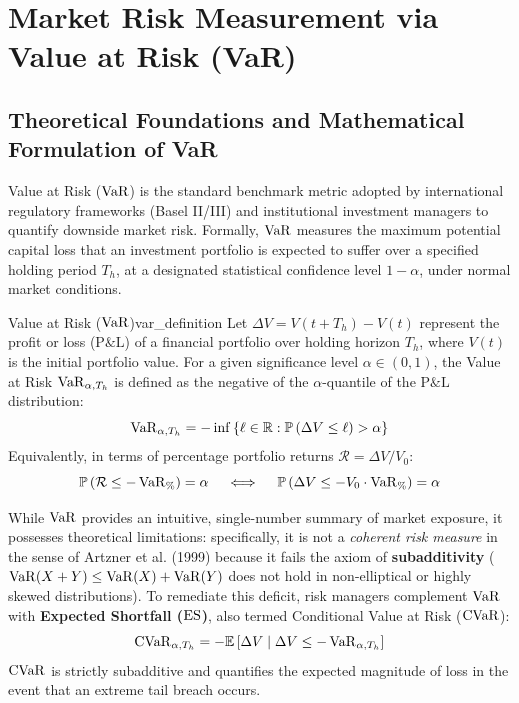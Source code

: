 
\chapter{Market Risk Measurement via Value at Risk (VaR)}
\label{ch:var_modeling}

\section{Theoretical Foundations and Mathematical Formulation of VaR}
\label{sec:var_foundations}

Value at Risk ($\operatorname{VaR}$) is the standard benchmark metric adopted by international regulatory frameworks (Basel II/III) and institutional investment managers to quantify downside market risk. Formally, $\operatorname{VaR}$ measures the maximum potential capital loss that an investment portfolio is expected to suffer over a specified holding period $T_h$, at a designated statistical confidence level $1 - \alpha$, under normal market conditions.

\begin{definition}{Value at Risk ($\operatorname{VaR}$)}{var_definition}
Let $\Delta V = V(t + T_h) - V(t)$ represent the profit or loss ($\text{P\&L}$) of a financial portfolio over holding horizon $T_h$, where $V(t)$ is the initial portfolio value. For a given significance level $\alpha \in (0, 1)$, the Value at Risk $\operatorname{VaR}_{\alpha, T_h}$ is defined as the negative of the $\alpha$-quantile of the $\text{P\&L}$ distribution:
\begin{equation}
\operatorname{VaR}_{\alpha, T_h} = -\inf \left\{ \ell \in \mathbb{R} : \mathbb{P}\left(\Delta V \le \ell\right) > \alpha \right\}
\label{eq:var_general}
\end{equation}
Equivalently, in terms of percentage portfolio returns $\mathcal{R} = \Delta V / V_0$:
\begin{equation}
\mathbb{P}\left(\mathcal{R} \le -\operatorname{VaR}_{\%}\right) = \alpha \quad \iff \quad \mathbb{P}\left(\Delta V \le -V_0 \cdot \operatorname{VaR}_{\%}\right) = \alpha
\end{equation}
\end{definition}

While $\operatorname{VaR}$ provides an intuitive, single-number summary of market exposure, it possesses theoretical limitations: specifically, it is not a \textit{coherent risk measure} in the sense of Artzner et al. (1999) because it fails the axiom of \textbf{subadditivity} ($\operatorname{VaR}(X + Y) \le \operatorname{VaR}(X) + \operatorname{VaR}(Y)$ does not hold in non-elliptical or highly skewed distributions). To remediate this deficit, risk managers complement $\operatorname{VaR}$ with \textbf{Expected Shortfall ($\operatorname{ES}$)}, also termed Conditional Value at Risk ($\operatorname{CVaR}$):
\begin{equation}
\operatorname{CVaR}_{\alpha, T_h} = -\mathbb{E}\left[ \Delta V \;\middle|\; \Delta V \le -\operatorname{VaR}_{\alpha, T_h} \right]
\label{eq:cvar_general}
\end{equation}
$\operatorname{CVaR}$ is strictly subadditive and quantifies the expected magnitude of loss in the event that an extreme tail breach occurs.

